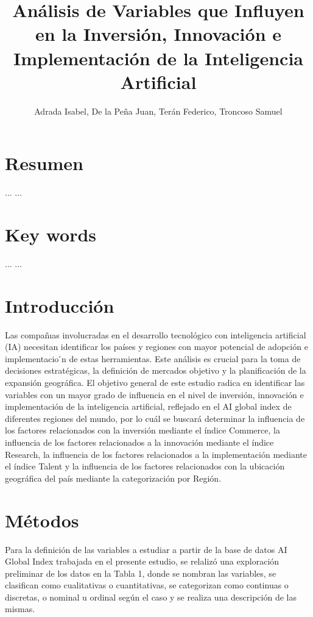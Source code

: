 \documentclass[
]{article}
\title{Análisis de Variables que Influyen en la Inversión, Innovación e
Implementación de la Inteligencia Artificial}
\author{Adrada Isabel, De la Peña Juan, Terán Federico, Troncoso Samuel}
\date{}
\begin{document}
\maketitle

\begin{multicols}{2}

\section{Resumen}
...
...

\section{Key words}
...
...

\section{Introducción}
Las compañıas involucradas en el desarrollo tecnológico con inteligencia artificial (IA) necesitan identificar los países y regiones con mayor potencial de adopción e implementacio ́n de estas herramientas. Este análisis es crucial para la toma de decisiones estratégicas, la definición de mercados objetivo y la planificación de la expansión geográfica. El objetivo general de este estudio radica en identificar las variables con un mayor grado de influencia en el nivel de inversión, innovación e implementación de la inteligencia artificial, reflejado en el AI global index de diferentes regiones del mundo, por lo cuál se buscará determinar la influencia de los factores relacionados con la inversión mediante el índice Commerce, la influencia de los factores relacionados a la innovación mediante el índice Research, la influencia de los factores relacionados a la implementación mediante el índice Talent y la influencia de los factores relacionados con la ubicación geográfica del país mediante la categorización por Región.




\section{Métodos}
Para la definición de las variables a estudiar a partir de la base de datos AI Global Index trabajada en el presente estudio, se relalizó una exploración preliminar de los datos en la Tabla 1, donde se nombran las variables, se clasifican como cualitativas o cuantitativas, se categorizan como continuas o discretas, o nominal u ordinal según el caso y se realiza una descripción de las mismas.

\end{multicols}
\end{document}
